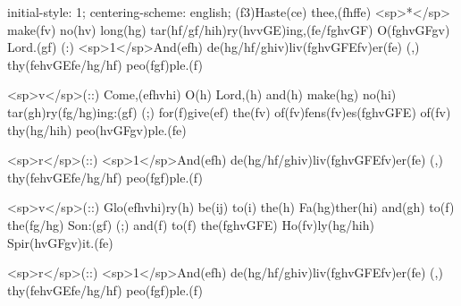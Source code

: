 initial-style: 1;
centering-scheme: english;
(f3)Haste(ce) thee,(fhffe) <sp>*</sp> make(fv) no(hv) long(hg) tar(hf/gf/hih)ry(hvvGE)ing,(fe/fghvGF) O(fghvGFgv) Lord.(gf) (:) <sp>1</sp>And(efh) de(hg/hf/ghiv)liv(fghvGFEfv)er(fe) (,) thy(fehvGEfe/hg/hf) peo(fgf)ple.(f) 

<sp>v</sp>(::) Come,(efhvhi) O(h) Lord,(h) and(h) make(hg) no(hi) tar(gh)ry(fg/hg)ing:(gf) (;) for(f)give(ef) the(fv) of(fv)fens(fv)es(fghvGFE) of(fv) thy(hg/hih) peo(hvGFgv)ple.(fe) 

<sp>r</sp>(::) <sp>1</sp>And(efh) de(hg/hf/ghiv)liv(fghvGFEfv)er(fe) (,) thy(fehvGEfe/hg/hf) peo(fgf)ple.(f) 

<sp>v</sp>(::) Glo(efhvhi)ry(h) be(ij) to(i) the(h) Fa(hg)ther(hi) and(gh) to(f) the(fg/hg) Son:(gf) (;) and(f) to(f) the(fghvGFE) Ho(fv)ly(hg/hih) Spir(hvGFgv)it.(fe)

<sp>r</sp>(::) <sp>1</sp>And(efh) de(hg/hf/ghiv)liv(fghvGFEfv)er(fe) (,) thy(fehvGEfe/hg/hf) peo(fgf)ple.(f) 